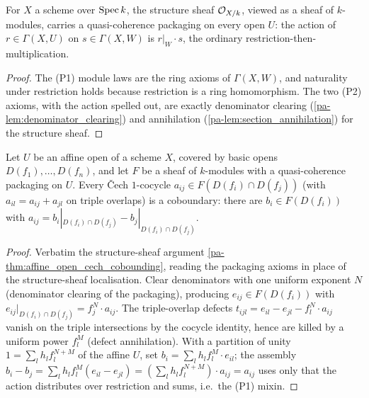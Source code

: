 \begin{theorem}
  \label{pa-thm:moduleKSheaf_qcohOn}
  \leanok

  For \(X\) a scheme over \(\operatorname{Spec} k\), the structure sheaf \(\mathcal{O}_{X/k}\), viewed as a sheaf of
  \(k\)-modules, carries a quasi-coherence packaging on every open \(U\): the action of \(r \in
  \Gamma(X, U)\) on \(s \in \Gamma(X, W)\) is \(r|_W \cdot s\), the ordinary
  restriction-then-multiplication.
\end{theorem}
\begin{proof}
  \leanok
  The (P1) module laws are the ring axioms of \(\Gamma(X, W)\), and naturality under restriction
  holds because restriction is a ring homomorphism. The two (P2) axioms, with the action spelled
  out, are exactly denominator clearing (\ref{pa-lem:denominator_clearing}) and annihilation
  (\ref{pa-lem:section_annihilation}) for the structure sheaf.
\end{proof}

\begin{theorem}
  \label{pa-thm:cech_cobounding_qcoh}
  \leanok

  Let \(U\) be an affine open of a scheme \(X\), covered by basic opens \(D(f_1), \dots, D(f_n)\),
  and let \(F\) be a sheaf of \(k\)-modules with a quasi-coherence packaging on \(U\). Every
  \v{C}ech \(1\)-cocycle \(a_{ij} \in F(D(f_i) \cap D(f_j))\) (with \(a_{il} = a_{ij} + a_{jl}\)
  on triple overlaps) is a coboundary: there are \(b_i \in F(D(f_i))\) with \(a_{ij} = b_i|_{D(f_i)
  \cap D(f_j)} - b_j|_{D(f_i) \cap D(f_j)}\).
\end{theorem}
\begin{proof}
  \leanok
  Verbatim the structure-sheaf argument \ref{pa-thm:affine_open_cech_cobounding}, reading the
  packaging axioms in place of the structure-sheaf localisation. Clear denominators with one
  uniform exponent \(N\) (denominator clearing of the packaging), producing \(e_{ij} \in
  F(D(f_i))\) with \(e_{ij}|_{D(f_i) \cap D(f_j)} = f_j^N \cdot a_{ij}\). The triple-overlap
  defects \(t_{ijl} = e_{il} - e_{jl} - f_l^N \cdot a_{ij}\) vanish on the triple intersections by
  the cocycle identity, hence are killed by a uniform power \(f_l^M\) (defect annihilation). With
  a partition of unity \(1 = \sum_l h_l f_l^{N+M}\) of the affine \(U\), set \(b_i = \sum_l h_l
  f_l^M \cdot e_{il}\); the assembly \(b_i - b_j = \sum_l h_l f_l^M(e_{il} - e_{jl}) = (\sum_l h_l
  f_l^{N+M}) \cdot a_{ij} = a_{ij}\) uses only that the action distributes over restriction and
  sums, i.e.\ the (P1) mixin.
\end{proof}


